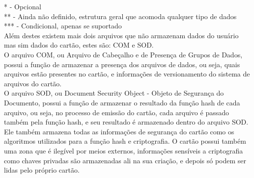 \documentclass{article}
\begin{document}
\begin{justify}
			\hspace*{2cm} * - Opcional\\
			\hspace*{2cm} ** - Ainda não definido, estrutura geral que acomoda qualquer tipo de dados\\
			\hspace*{2cm} *** - Condicional, apenas se suportado\\
			
			\hspace*{2cm}Além destes existem mais dois arquivos que não armazenam dados do usuário mas sim dados do cartão, estes são: COM e SOD.\\
			\hspace*{2cm} O arquivo COM, ou Arquivo de Cabeçalho e de Presença de Grupos de Dados, possui a função de armazenar a presença dos arquivos de dados, ou seja, quais arquivos estão presentes no cartão, e informações de versionamento do sistema de arquivos do cartão. \\
			\hspace*{2cm} O arquivo SOD, ou Document Security Object - Objeto de Segurança do Documento, possui a função de armazenar o resultado da função hash de cada arquivo, ou seja, no processo de emissão do cartão, cada arquivo é passado também pela função hash, e seu resultado é armazenado dentro do arquivo SOD. Ele também armazena todas as informações de segurança do cartão como os algoritmos utilizados para a função hash e criptografia.
			\hspace*{2cm} O cartão possui também uma zona que é ilegível por meios externos, informações sensíveis a criptografia como chaves privadas são armazenadas ali na sua criação, e depois só podem ser lidas pelo próprio cartão.
		\end{justify}
\end{document}
